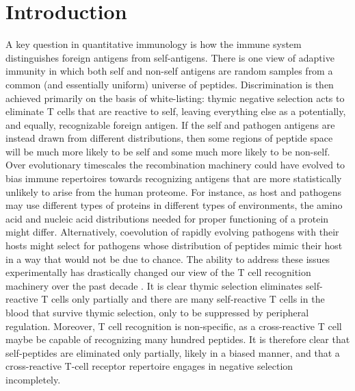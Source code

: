 \documentclass[superscriptaddress,twocolumn,pre]{revtex4}
\newcommand{\<}{\langle}
\renewcommand{\>}{\rangle}
\begin{document}
\maketitle

\section{Introduction}

A key question in quantitative immunology is how the immune system distinguishes foreign antigens from self-antigens. There is one view of adaptive immunity in which both self and non-self antigens are random samples from a common (and essentially uniform) universe of peptides. Discrimination is then achieved primarily on the basis of white-listing: thymic negative selection acts to eliminate T cells that are reactive to self, leaving everything else as a potentially, and equally, recognizable foreign antigen. If the self and pathogen antigens are instead drawn from different distributions, then some regions of peptide space will be much more likely to be self and some much more likely to be non-self. Over evolutionary timescales the recombination machinery could have evolved to bias immune repertoires towards recognizing antigens that are more statistically unlikely to arise from the human proteome. For instance, as host and pathogens may use different types of proteins in different types of environments, the amino acid and nucleic acid distributions needed for proper functioning of a protein might differ. Alternatively, coevolution of rapidly evolving pathogens with their hosts might select for pathogens whose distribution of peptides mimic their host in a way that would not be due to chance. The ability to address these issues experimentally has drastically changed our view of the T cell recognition machinery over the past decade \cite{Davis2015, Birnbaum2014}. It is clear thymic selection eliminates self-reactive T cells only partially and there are many self-reactive T cells in the blood that survive thymic selection, only to be suppressed by peripheral regulation. Moreover, T cell recognition is non-specific, as a cross-reactive T cell maybe be capable of recognizing many hundred peptides. It is therefore clear that self-peptides are eliminated only partially, likely in a biased manner, and that a cross-reactive T-cell receptor repertoire engages in negative selection incompletely. 
\end{document}
